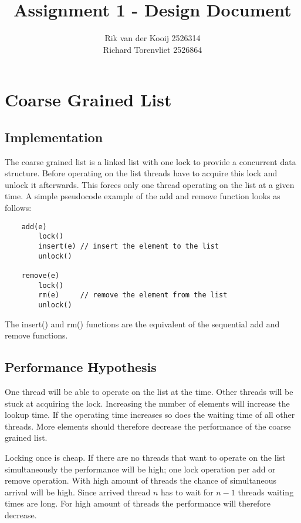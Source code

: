 \documentclass[10pt,a4paper]{article}
\author{Rik van der Kooij 2526314\\Richard Torenvliet 2526864}
\title{Assignment 1 - Design Document}
\begin{document}
\maketitle


\section{Coarse Grained List}
\subsection{Implementation}
    The coarse grained list is a linked list with one lock to provide a
    concurrent data structure. Before operating on the list threads have to
    acquire this lock and unlock it afterwards. This forces only one thread
    operating on the list at a given time. A simple pseudocode example of the
    add and remove function looks as follows:

\begin{lstlisting}
    add(e) 
        lock()
        insert(e) // insert the element to the list
        unlock()

    remove(e)
        lock()
        rm(e)     // remove the element from the list
        unlock()
\end{lstlisting}

The insert() and rm() functions are the equivalent of the sequential add and remove
functions.

\subsection{Performance Hypothesis}
One thread will be able to operate on the list at the time. Other threads will
be stuck at acquiring the lock. Increasing the number of elements will increase
the lookup time. If the operating time increases so does the waiting time of
all other threads. More elements should therefore decrease the performance of
the coarse grained list.

Locking once is cheap. If there are no threads that want to operate on the list
simultaneously the performance will be high; one lock operation per add or
remove operation.  With high amount of threads the chance of simultaneous
arrival will be high. Since arrived thread $n$ has to wait for $n-1$ threads
waiting times are long. For high amount of threads the performance will
therefore decrease. 
\end{document}
